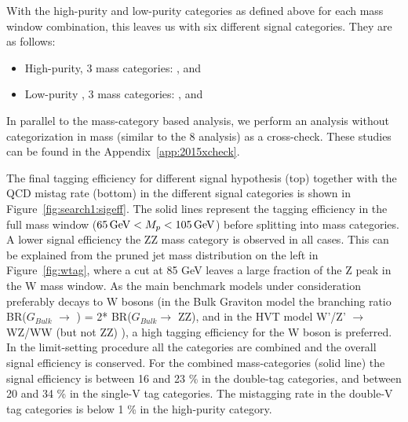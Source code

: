 With the high-purity and low-purity categories as defined above for each mass window combination, this leaves us with six different signal categories. They are as follows:
\begin{itemize}
\item High-purity, 3 mass categories: \WW, \ZZ and \WZ
\item Low-purity , 3 mass categories: \WW, \ZZ and \WZ
\end{itemize}
In parallel to the mass-category based analysis, we perform an analysis without categorization in mass (similar to the 8 \TeV analysis) as a cross-check. These studies can be found in the Appendix~\ref{app:2015xcheck}.

The final tagging efficiency for different signal hypothesis (top) together with the QCD mistag rate (bottom) in the different signal categories is shown in Figure~\ref{fig:search1:sigeff}. The solid lines represent the tagging efficiency in the full mass window ($65 {\,\text{Ge\hspace{-.08em}V}} < M_{p} < 105 {\,\text{Ge\hspace{-.08em}V}}$) before splitting into mass categories. A lower signal efficiency the ZZ mass category is observed in all cases. This can be explained from the pruned jet mass distribution on the left in Figure~\ref{fig:wtag}, where a cut at 85 GeV leaves a large fraction of the Z peak in the W mass window. As the main benchmark models under consideration preferably decays to W bosons (in the Bulk Graviton model the branching ratio BR($G_{Bulk}$ $\rightarrow$ \PW\PW) = 2* BR($G_{Bulk}$$\rightarrow$ ZZ), and in the HVT model W'/Z' $\rightarrow$ WZ/WW (but not ZZ) ), a high tagging efficiency for the W boson is preferred. In the limit-setting procedure all the categories are combined and the overall signal efficiency is conserved. For the combined mass-categories (solid line) the signal efficiency is between 16 and 23 \% in the double-tag categories, and between 20 and 34 \% in the single-V tag categories. The mistagging rate in the double-V tag categories is below 1 \% in the high-purity category.


